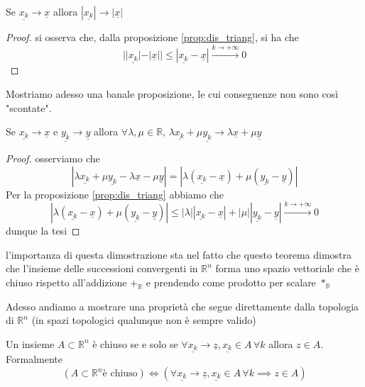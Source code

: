 \documentclass[openany]{book}
\begin{document}
\begin{prop}
Se $\underline{x_k} \to \underline{x}$ allora $|\underline{x_k}| \to |\underline{x}|$
\end{prop}
\begin{proof}
si osserva che, dalla proposizione \ref{prop:dis_triang}, si ha che
$$
||\underline{x_k}| - |\underline{x}|| \leq |\underline{x_k} - \underline{x}| \stackrel{k \to +\infty}{\to} 0
$$
\end{proof}
\noindent Mostriamo adesso una banale proposizione, le cui conseguenze non sono così "scontate".
\begin{prop}
Se $\underline{x_k} \to \underline{x}$ e $\underline{y_k} \to \underline{y}$ allora $\forall \lambda, \mu \in \mathbb{R}, \, \lambda \underline{x_k} + \mu \underline{y_k} \to \lambda \underline{x} + \mu \underline{y}$ 
\end{prop}
\begin{proof}
osserviamo che
$$
|\lambda \underline{x_k} + \mu \underline{y_k} - \lambda \underline{x} - \mu \underline{y}| = |\lambda (\underline{x_k} - \underline{x}) + \mu (\underline{y_k} - \underline{y})|
$$
Per la proposizione \ref{prop:dis_triang} abbiamo che
$$
|\lambda (\underline{x_k} - \underline{x}) + \mu (\underline{y_k} - \underline{y})| \leq |\lambda| |\underline{x_k} - \underline{x}| + |\mu| |\underline{y_k} - \underline{y}| \stackrel{k \to +\infty}{\to} 0
$$
dunque la tesi
\end{proof}
\begin{remark}
l'importanza di questa dimostrazione sta nel fatto che questo teorema dimostra che l'insieme delle successioni convergenti in $\mathbb{R}^n$ forma uno spazio vettoriale che è chiuso rispetto all'addizione $+_{\mathbb{R}}$ e prendendo come prodotto per scalare $*_\mathbb{R}$
\end{remark}
\noindent Adesso andiamo a mostrare una proprietà che segue direttamente dalla topologia di $\mathbb{R}^n$ (in spazi topologici qualunque non è sempre valido)
\begin{prop}
	Un insieme $A \subset \mathbb{R}^n$ è chiuso se e solo se $\forall \underline{x_k} \to \underline{z}, \underline{x_k} \in A \, \forall k$ allora $z \in A$. Formalmente
	$$
	(A \subset \mathbb{R}^n \text{è chiuso}) \iff (\forall \underline{x_k} \to \underline{z}, \underline{x_k} \in A \, \forall k \implies z \in A) 
	$$
	\label{prop:caratt_chiusi}
\end{prop}
\end{document}
